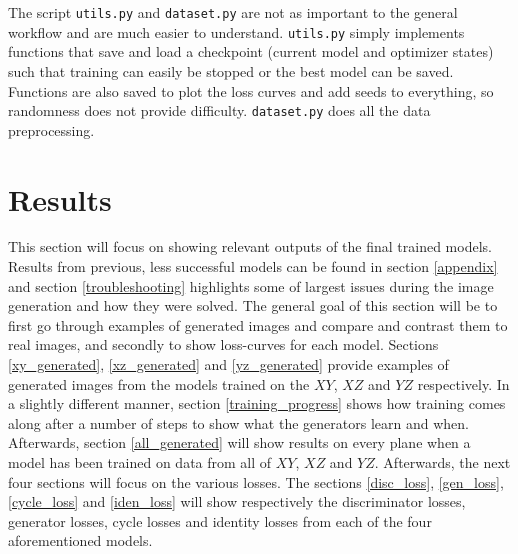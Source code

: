 \documentclass[12pt, fleqn, titlepage]{article}
\begin{document}
The script \texttt{utils.py} and \texttt{dataset.py} are not as important to the general workflow and are much easier to understand. \texttt{utils.py} simply implements functions that save and load a checkpoint (current model and optimizer states) such that training can easily be stopped or the best model can be saved. Functions are also saved to plot the loss curves and add seeds to everything, so randomness does not provide difficulty. \texttt{dataset.py} does all the data preprocessing.

\section{Results}\label{results}

This section will focus on showing relevant outputs of the final trained models. Results from previous, less successful models can be found in section \ref{appendix} and section \ref{troubleshooting} highlights some of largest issues during the image generation and how they were solved. The general goal of this section will be to first go through examples of generated images and compare and contrast them to real images, and secondly to show loss-curves for each model. Sections \ref{xy_generated}, \ref{xz_generated} and \ref{yz_generated} provide examples of generated images from the models trained on the $XY$, $XZ$ and $YZ$ respectively. In a slightly different manner, section \ref{training_progress} shows how training comes along after a number of steps to show what the generators learn and when. Afterwards, section \ref{all_generated} will show results on every plane when a model has been trained on data from all of $XY$, $XZ$ and $YZ$. Afterwards, the next four sections will focus on the various losses. The sections \ref{disc_loss}, \ref{gen_loss}, \ref{cycle_loss} and \ref{iden_loss} will show respectively the discriminator losses, generator losses, cycle losses and identity losses from each of the four aforementioned models.
\end{document}
